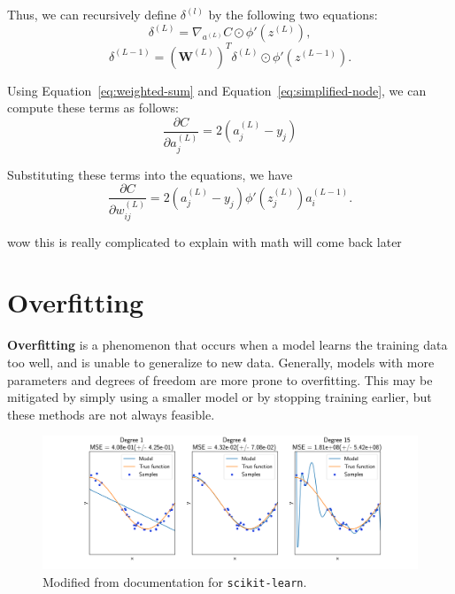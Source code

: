 \documentclass[12pt]{report}
\theoremstyle{definition}
\theoremstyle{remark}
\begin{document}
Thus, we can recursively define $\delta^{(l)}$ by the following two equations:
\begin{equation}
    \delta^{(L)} = \nabla_{a^{(L)}}C \odot \phi'(z^{(L)}),
\end{equation}
\begin{equation}
    \delta^{(L-1)} = {\left(\mathbf{W}^{(L)}\right)}^T \delta^{(L)} \odot \phi'(z^{(L-1)}).
\end{equation}

Using Equation~\ref{eq:weighted-sum} and Equation~\ref{eq:simplified-node}, we can compute these terms as follows:
\begin{equation}
    \frac{\partial C}{\partial a_j^{(L)}} = 2(a_j^{(L)} - y_j)
\end{equation}

Substituting these terms into the equations, we have
\begin{equation}
    \frac{\partial C}{\partial w_{ij}^{(L)}} = 2(a_j^{(L)} - y_j) \phi'(z_j^{(L)}) a_i^{(L-1)}.
\end{equation}

wow this is really complicated to explain with math will come back later

\section{Overfitting}\label{sec:overfitting}
\textbf{Overfitting} is a phenomenon that occurs when a model learns the training data too well, and is unable to generalize to new data. Generally, models with more parameters and degrees of freedom are more prone to overfitting. This may be mitigated by simply using a smaller model or by stopping training earlier, but these methods are not always feasible.

\begin{figure}
    \centering
    \includegraphics[width=\linewidth]{figs/underfitting_overfitting.png}
    \caption{Modified from documentation for \texttt{scikit-learn}.~\cite{pedregosa_scikit-learn_2011}}
    \label{fig:enter-label}
\end{figure}
\end{document}
